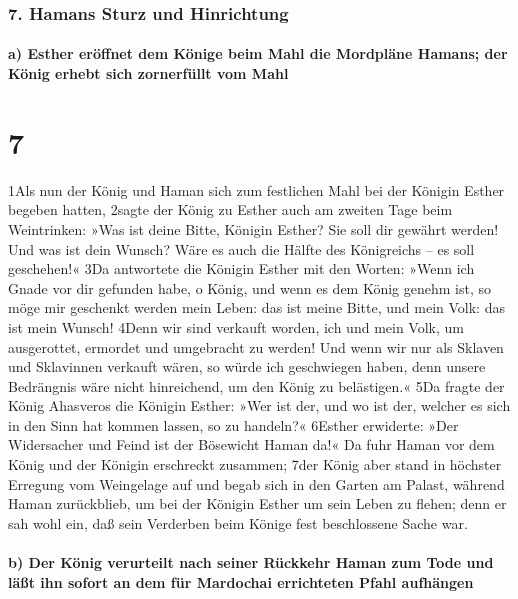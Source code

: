 \hypertarget{hamans-sturz-und-hinrichtung}{%
\subsubsection{7. Hamans Sturz und
Hinrichtung}\label{hamans-sturz-und-hinrichtung}}

\hypertarget{a-esther-eruxf6ffnet-dem-kuxf6nige-beim-mahl-die-mordpluxe4ne-hamans-der-kuxf6nig-erhebt-sich-zornerfuxfcllt-vom-mahl}{%
\paragraph{a) Esther eröffnet dem Könige beim Mahl die Mordpläne Hamans;
der König erhebt sich zornerfüllt vom
Mahl}\label{a-esther-eruxf6ffnet-dem-kuxf6nige-beim-mahl-die-mordpluxe4ne-hamans-der-kuxf6nig-erhebt-sich-zornerfuxfcllt-vom-mahl}}

\hypertarget{section-6}{%
\section{7}\label{section-6}}

1Als nun der König und Haman sich zum festlichen Mahl bei der Königin
Esther begeben hatten, 2sagte der König zu Esther auch am zweiten Tage
beim Weintrinken: »Was ist deine Bitte, Königin Esther? Sie soll dir
gewährt werden! Und was ist dein Wunsch? Wäre es auch die Hälfte des
Königreichs -- es soll geschehen!« 3Da antwortete die Königin Esther mit
den Worten: »Wenn ich Gnade vor dir gefunden habe, o König, und wenn es
dem König genehm ist, so möge mir geschenkt werden mein Leben: das ist
meine Bitte, und mein Volk: das ist mein Wunsch! 4Denn wir sind verkauft
worden, ich und mein Volk, um ausgerottet, ermordet und umgebracht zu
werden! Und wenn wir nur als Sklaven und Sklavinnen verkauft wären, so
würde ich geschwiegen haben, denn unsere Bedrängnis wäre nicht
hinreichend, um den König zu belästigen.« 5Da fragte der König Ahasveros
die Königin Esther: »Wer ist der, und wo ist der, welcher es sich in den
Sinn hat kommen lassen, so zu handeln?« 6Esther erwiderte: »Der
Widersacher und Feind ist der Bösewicht Haman da!« Da fuhr Haman vor dem
König und der Königin erschreckt zusammen; 7der König aber stand in
höchster Erregung vom Weingelage auf und begab sich in den Garten am
Palast, während Haman zurückblieb, um bei der Königin Esther um sein
Leben zu flehen; denn er sah wohl ein, daß sein Verderben beim Könige
fest beschlossene Sache war.

\hypertarget{b-der-kuxf6nig-verurteilt-nach-seiner-ruxfcckkehr-haman-zum-tode-und-luxe4uxdft-ihn-sofort-an-dem-fuxfcr-mardochai-errichteten-pfahl-aufhuxe4ngen}{%
\paragraph{b) Der König verurteilt nach seiner Rückkehr Haman zum Tode
und läßt ihn sofort an dem für Mardochai errichteten Pfahl
aufhängen}\label{b-der-kuxf6nig-verurteilt-nach-seiner-ruxfcckkehr-haman-zum-tode-und-luxe4uxdft-ihn-sofort-an-dem-fuxfcr-mardochai-errichteten-pfahl-aufhuxe4ngen}}

